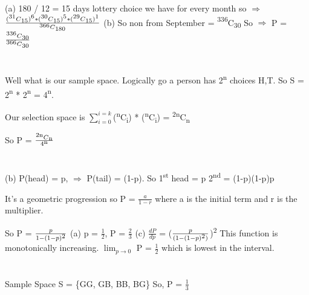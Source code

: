 \documentclass{report}
\begin{document}
{	\section{}
	(a) 180 / 12 = 15 days lottery choice we have for every month so {$\Rightarrow$} 
	{$\frac{({\textsuperscript{31}}C{\textsubscript{15}}){\textsuperscript{6}} * ({\textsuperscript{30}}C{\textsubscript{15}}){\textsuperscript{5}} * 
			({\textsuperscript{29}}C{\textsubscript{15}}){\textsuperscript{1}}}{{\textsuperscript{366}C{\textsubscript{180}}}}$}{\newline}
	{\newline}
	(b) So non from September = {\textsuperscript{336}}C{\textsubscript{30}}
	So {$\Rightarrow$} P = {$\frac{{\textsuperscript{336}}C{\textsubscript{30}}}{{\textsuperscript{366}}C{\textsubscript{30}}}$}
	
	\section{}
	Well what is our sample space. Logically go a person has 2{\textsuperscript{n}} choices {H,T}. So S = 2{\textsuperscript{n}} * 2{\textsuperscript{n}} = 4{\textsuperscript{n}}.
	
	Our selection space is {$\sum_{i=0}^{i=k}$}({\textsuperscript{n}C{\textsubscript{i}}}) * ({\textsuperscript{n}C{\textsubscript{i}}}) = {\textsuperscript{2n}}C{\textsubscript{n}}
	
	So P = {$\frac{{\textsuperscript{2n}}C{\textsubscript{n}}}{4{\textsuperscript{n}}}$}
	
	\section{}
	(b) P(head) = p, {$\Rightarrow$} P(tail) = (1-p).
	So 1{\textsuperscript{st}} head = p
	2{\textsuperscript{nd}} = (1-p)(1-p)p
	
	It's a geometric progression so P = {$\frac{a}{1 - r}$} where a is the initial term and r is the multiplier. 
	
	So P = {$\frac{p}{1 - (1-p){\textsuperscript{2}}}$}
	{\newline}
	(a) p = {$\frac{1}{2}$}, P = {$\frac{2}{3}$}
	{\newline}
	(c) {$\frac{dP}{dp}$} = ({$\frac{p}{(1 - (1 - p){\textsuperscript{2}})}$}){\textsuperscript{2}} This function is monotonically increasing.
	{$\lim_{p {\rightarrow} 0}$} P = {$\frac{1}{2}$} which is lowest in the interval.
	
	\section{}
	Sample Space S = \{GG, GB, BB, BG\}
	So, P = {$\frac{1}{3}$}
	{\newline}
	
}
\end{document}
